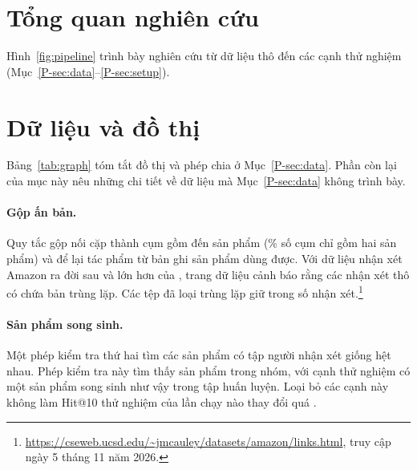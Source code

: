 \section{Tổng quan nghiên cứu}
\label{app:overview}

Hình~\ref{fig:pipeline} trình bày nghiên cứu từ dữ liệu thô đến các cạnh thử nghiệm
(Mục~\ref*{P-sec:data}--\ref*{P-sec:setup}).



\section{Dữ liệu và đồ thị}
\label{app:graph}

Bảng~\ref{tab:graph} tóm tắt đồ thị và phép chia ở Mục~\ref*{P-sec:data}. Phần còn lại của mục
này nêu những chi tiết về dữ liệu mà Mục~\ref*{P-sec:data} không trình bày.

\paragraph{Gộp ấn bản.} Quy tắc gộp nối  cặp thành  cụm
gồm  đến  sản phẩm (\% số cụm
chỉ gồm hai sản phẩm) và để lại  tác phẩm từ  bản ghi sản phẩm dùng
được. Với dữ liệu nhận xét Amazon ra đời sau và lớn hơn của \citet{mcauley2015image}, trang dữ liệu
cảnh báo rằng các nhận xét thô có chứa bản trùng lặp. Các tệp đã loại trùng lặp giữ
 trong số 
nhận xét.\footnote{\url{https://cseweb.ucsd.edu/~jmcauley/datasets/amazon/links.html}, truy cập
ngày 5 tháng 11 năm 2026.}

\paragraph{Sản phẩm song sinh.} Một phép kiểm tra thứ hai tìm các sản phẩm có tập người nhận xét
giống hệt nhau. Phép kiểm tra này tìm thấy  sản phẩm trong 
nhóm, với  cạnh thử nghiệm có một sản phẩm song sinh như vậy trong tập huấn luyện.
Loại bỏ các cạnh này không làm Hit@10 thử nghiệm của lần chạy nào thay đổi quá .

